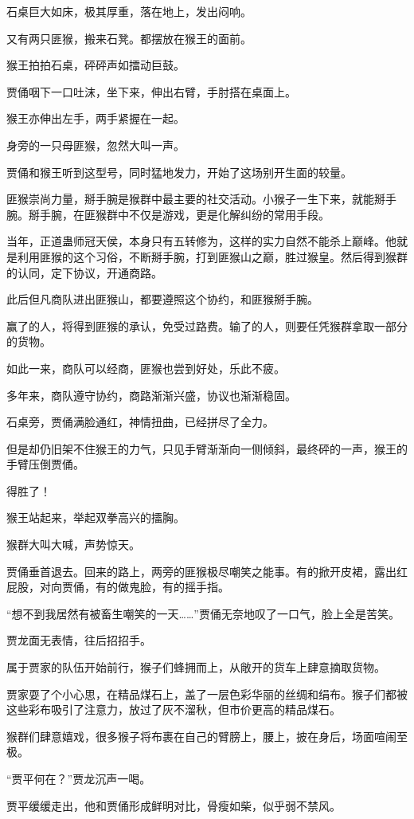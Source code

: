 \begin{this_body}
石桌巨大如床，极其厚重，落在地上，发出闷响。

又有两只匪猴，搬来石凳。都摆放在猴王的面前。

猴王拍拍石桌，砰砰声如擂动巨鼓。

贾俑咽下一口吐沫，坐下来，伸出右臂，手肘搭在桌面上。

猴王亦伸出左手，两手紧握在一起。

身旁的一只母匪猴，忽然大叫一声。

贾俑和猴王听到这型号，同时猛地发力，开始了这场别开生面的较量。

匪猴崇尚力量，掰手腕是猴群中最主要的社交活动。小猴子一生下来，就能掰手腕。掰手腕，在匪猴群中不仅是游戏，更是化解纠纷的常用手段。

当年，正道蛊师冠天侯，本身只有五转修为，这样的实力自然不能杀上巅峰。他就是利用匪猴的这个习俗，不断掰手腕，打到匪猴山之巅，胜过猴皇。然后得到猴群的认同，定下协议，开通商路。

此后但凡商队进出匪猴山，都要遵照这个协约，和匪猴掰手腕。

赢了的人，将得到匪猴的承认，免受过路费。输了的人，则要任凭猴群拿取一部分的货物。

如此一来，商队可以经商，匪猴也尝到好处，乐此不疲。

多年来，商队遵守协约，商路渐渐兴盛，协议也渐渐稳固。

石桌旁，贾俑满脸通红，神情扭曲，已经拼尽了全力。

但是却仍旧架不住猴王的力气，只见手臂渐渐向一侧倾斜，最终砰的一声，猴王的手臂压倒贾俑。

得胜了！

猴王站起来，举起双拳高兴的擂胸。

猴群大叫大喊，声势惊天。

贾俑垂首退去。回来的路上，两旁的匪猴极尽嘲笑之能事。有的掀开皮裙，露出红屁股，对向贾俑，有的做鬼脸，有的摇手指。

“想不到我居然有被畜生嘲笑的一天……”贾俑无奈地叹了一口气，脸上全是苦笑。

贾龙面无表情，往后招招手。

属于贾家的队伍开始前行，猴子们蜂拥而上，从敞开的货车上肆意摘取货物。

贾家耍了个小心思，在精品煤石上，盖了一层色彩华丽的丝绸和绢布。猴子们都被这些彩布吸引了注意力，放过了灰不溜秋，但市价更高的精品煤石。

猴群们肆意嬉戏，很多猴子将布裹在自己的臂膀上，腰上，披在身后，场面喧闹至极。

“贾平何在？”贾龙沉声一喝。

贾平缓缓走出，他和贾俑形成鲜明对比，骨瘦如柴，似乎弱不禁风。


\end{this_body}
